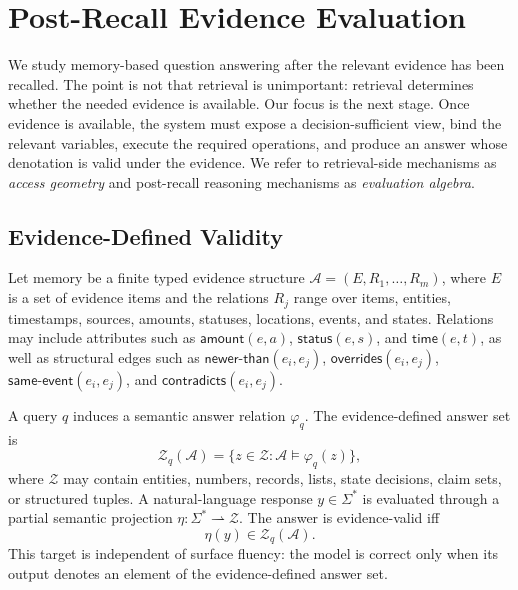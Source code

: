 \section{Post-Recall Evidence Evaluation}
\label{sec:framework}

We study memory-based question answering after the relevant evidence has been recalled.
The point is not that retrieval is unimportant: retrieval determines whether the needed evidence is available.
Our focus is the next stage.
Once evidence is available, the system must expose a decision-sufficient view, bind the relevant variables, execute the required operations, and produce an answer whose denotation is valid under the evidence.
We refer to retrieval-side mechanisms as \emph{access geometry} and post-recall reasoning mechanisms as \emph{evaluation algebra}.

\subsection{Evidence-Defined Validity}
\label{subsec:evidence-validity}

Let memory be a finite typed evidence structure $\mathcal A=(E,R_1,\ldots,R_m)$, where $E$ is a set of evidence items and the relations $R_j$ range over items, entities, timestamps, sources, amounts, statuses, locations, events, and states.
Relations may include attributes such as $\mathsf{amount}(e,a)$, $\mathsf{status}(e,s)$, and $\mathsf{time}(e,t)$, as well as structural edges such as $\mathsf{newer\text{-}than}(e_i,e_j)$, $\mathsf{overrides}(e_i,e_j)$, $\mathsf{same\text{-}event}(e_i,e_j)$, and $\mathsf{contradicts}(e_i,e_j)$.

A query $q$ induces a semantic answer relation $\varphi_q$.
The evidence-defined answer set is
\begin{equation}
\mathcal Z_q(\mathcal A)=\{z\in\mathcal Z:\mathcal A\models\varphi_q(z)\},
\label{eq:semantic-answer-set}
\end{equation}
where $\mathcal Z$ may contain entities, numbers, records, lists, state decisions, claim sets, or structured tuples.
A natural-language response $y\in\Sigma^\ast$ is evaluated through a partial semantic projection $\eta:\Sigma^\ast\rightharpoonup\mathcal Z$.
The answer is evidence-valid iff
\begin{equation}
\eta(y)\in\mathcal Z_q(\mathcal A).
\label{eq:evidence-valid}
\end{equation}
This target is independent of surface fluency: the model is correct only when its output denotes an element of the evidence-defined answer set.

